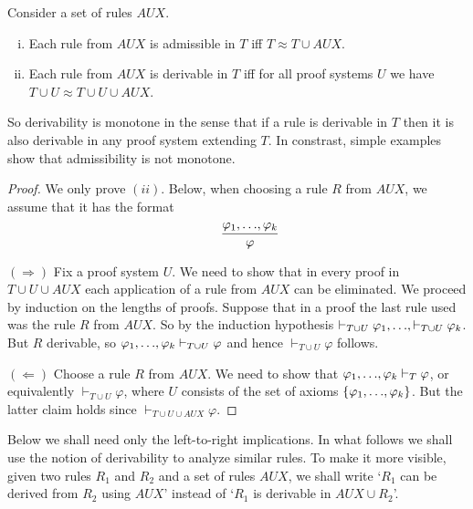 \documentclass[runningheads]{llncs}       %
\newcommand{\AUX}{\mathit{AUX}}
\begin{document}
\begin{lemma} \label{lem:AUX}
  Consider a set of rules $\AUX$.
  \begin{enumerate}[(i)]
  \item 
  Each rule from $\AUX$ is admissible in $T$ iff $T \approx T \cup \AUX$. 

\item Each rule from $\AUX$ is derivable in $T$ iff for all proof
  systems $U$ we have $T \cup U \approx T \cup U \cup \AUX$.

\end{enumerate}
\end{lemma}

So derivability is monotone in the sense that if a rule is derivable
in $T$ then it is also derivable in any proof system extending $T$. In
constrast, simple examples show that admissibility is not monotone.

\begin{proof}
  We only prove $(ii)$.
Below, when choosing a rule $R$ from $\AUX$, we assume that it has the format
\[ 
 \qquad \frac{\varphi_1,\mbox{$\ldots$},\varphi_k}{\varphi}
\]

\III

\NI
$(\Rightarrow)$ Fix a proof system $U$.  We need to show that in every
proof in $T \cup U \cup \AUX$ each application of a rule from $\AUX$
can be eliminated.  We proceed by induction on the lengths of
proofs. Suppose that in a proof the last rule used was the rule $R$ from $\AUX$.
So by the induction hypothesis
$ \vdash_{T \cup U} \varphi_1, \mbox{$\ldots$}, \vdash_{T \cup U} \varphi_k$.  But $R$
derivable, so 
$\varphi_1, \mbox{$\ldots$}, \varphi_k \vdash_{T \cup U} \varphi$ and hence
$\vdash_{T \cup U} \varphi$ follows.

\III

\NI
$(\Leftarrow)$ Choose a rule $R$ from $\AUX$.
We need to show that
$\varphi_1, \mbox{$\ldots$}, \varphi_k \vdash_T \varphi$, or equivalently
$\vdash_{T \cup U} \varphi$, where $U$ consists of the set of axioms
$\mbox{$\{{\varphi_1,\mbox{$\ldots$},\varphi_k}\}$}$.  But the latter claim holds since
$\vdash_{T \cup U \cup \AUX} \varphi$.
\HB
\end{proof}

Below we shall need only the left-to-right implications.  In what
follows we shall use the notion of derivability to analyze similar
rules. To make it more visible, given two rules $R_1$ and $R_2$ and a
set of rules $\AUX$, we shall write `$R_1$ can be derived from $R_2$
using $\AUX$' instead of `$R_1$ is derivable in $\AUX \cup R_2$'.
\end{document}
